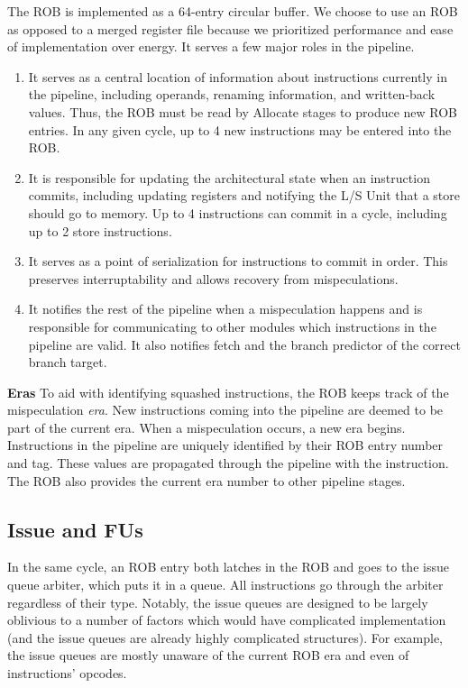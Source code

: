\documentclass{article}
\begin{document}
The ROB is implemented as a 64-entry circular buffer.  We choose to use an ROB
as opposed to a merged register file because we prioritized performance and ease
of implementation over energy.  It serves a few major roles in the pipeline.

\begin{enumerate}
    \item It serves as a central location of information about instructions
        currently in the pipeline, including operands, renaming information, and
        written-back values. Thus, the ROB must be read by Allocate stages to
        produce new ROB entries. In any given cycle, up to 4 new instructions
        may be entered into the ROB.

    \item It is responsible for updating the architectural state when an
        instruction commits, including updating registers and notifying the L/S
        Unit that a store should go to memory. Up to 4 instructions can commit
        in a cycle, including up to 2 store instructions.

    \item It serves as a point of serialization for instructions to commit in
        order. This preserves interruptability and allows recovery from
        mispeculations.

    \item It notifies the rest of the pipeline when a mispeculation happens and
        is responsible for communicating to other modules which instructions in
        the pipeline are valid. It also notifies fetch and the branch predictor
        of the correct branch target.
\end{enumerate}

\textbf{Eras} To aid with identifying squashed instructions, the ROB keeps track
of the mispeculation \textit{era}. New instructions coming into the pipeline are
deemed to be part of the current era. When a mispeculation occurs, a new era
begins.  Instructions in the pipeline are uniquely identified by their ROB entry
number and tag. These values are propagated through the pipeline with the
instruction. The ROB also provides the current era number to other pipeline
stages.

\subsection{Issue and FUs}

In the same cycle, an ROB entry both latches in the ROB and goes to the issue
queue arbiter, which puts it in a queue. All instructions go through the arbiter
regardless of their type. Notably, the issue queues are designed to be largely
oblivious to a number of factors which would have complicated implementation
(and the issue queues are already highly complicated structures). For example,
the issue queues are mostly unaware of the current ROB era and even of
instructions' opcodes.
\end{document}
